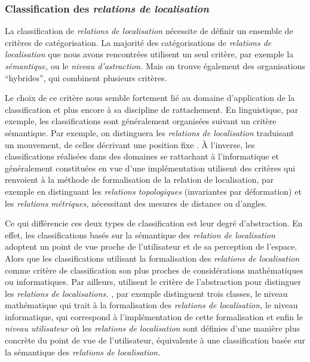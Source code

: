 \subsubsection{Classification des \emph{relations de localisation}}

La classification de \emph{relations de localisation} nécessite de
définir un ensemble de critères de catégorisation. La majorité des
catégorisations de \emph{relations de localisation} que nous avons
rencontrées utilisent un seul critère, par exemple la
\emph{sémantique,} ou le\emph{ niveau d'astraction.} Mais on trouve
également des organisations \enquote{hybrides}, qui combinent
plusieurs critères.

Le choix de ce critère nous semble fortement lié au domaine
d’application de la classification et plus encore à sa discipline de
rattachement. En linguistique, par exemple, les classifications sont
généralement organisées suivant un critère sémantique. Par exemple, on
distinguera les \emph{relations de localisation} traduisant un
mouvement, de celles décrivant une position fixe
\autocite{Borillo1998}. À l'inverse, les classifications réalisées
dans des domaines se rattachant à l'informatique et généralement
constituées en vue d'une implémentation utilisent des critères qui
renvoient à la méthode de formalisation de la relation de
localisation, par exemple en distinguant les \emph{relations
  topologiques} (\ie invariantes par déformation) et les
\emph{relations métriques,} nécessitant des mesures de distance ou
d'angles.

Ce qui différencie ces deux types de classification est leur degré
d'abstraction. En effet, les classifications basés sur la sémantique
des \emph{relation de localisation} adoptent un point de vue proche de
l'utilisateur et de sa perception de l'espace. Alors que les
classifications utilisant la formalisation des \emph{relations de
  localisation} comme critère de classification son plus proches de
considérations mathématiques ou informatiques. Par ailleurs,
\textcite{Clementini2008a,Bucher2012} utilisent le critère de
l’abstraction pour distinguer les \emph{relations de localisations.}
\textcite{Clementini2008a}, par exemple distinguent trois classes, le
niveau mathématique qui trait à la formalisation des \emph{relations
  de localisation,} le niveau informatique, qui correspond à
l'implémentation de cette formalisation et enfin le \emph{niveau
  utilisateur} où les \emph{relations de localisation} sont définies
d'une manière plus concrète du point de vue de l'utilisateur, \ie
équivalente à une classification basée sur la sémantique des
\emph{relations de localisation.}


